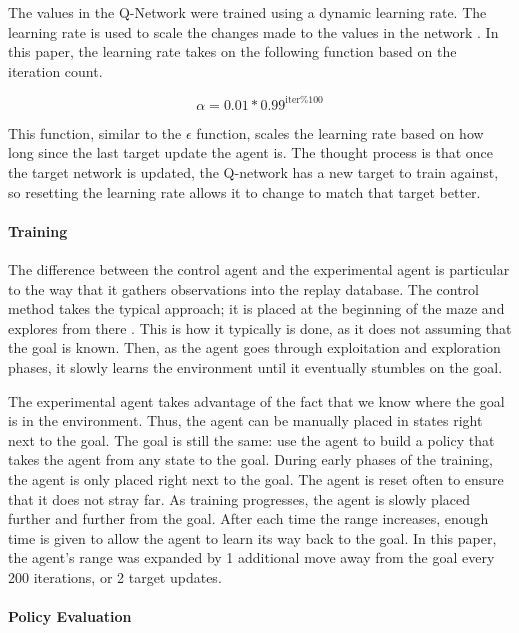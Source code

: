 \documentclass[12pt]{article}
\begin{document}
The values in the Q-Network were trained using a dynamic learning rate.
The learning rate is used to scale the changes made to the values in the network \cite{article_reinforcement_learning_for_robots}.
In this paper, the learning rate takes on the following function based on the iteration count.

$$\alpha = 0.01 * 0.99^{\text{iter} \% 100}$$

This function, similar to the $\epsilon$ function, scales the learning rate based on how long since the last target update the agent is.
The thought process is that once the target network is updated, the Q-network has a new target to train against, so resetting the learning rate allows it to change to match that target better.

\paragraph{Training} 

The difference between the control agent and the experimental agent is particular to the way that it gathers observations into the replay database.
The control method takes the typical approach; it is placed at the beginning of the maze and explores from there \cite{article_reinforcement_learning_survey}.
This is how it typically is done, as it does not assuming that the goal is known.
Then, as the agent goes through exploitation and exploration phases, it slowly learns the environment until it eventually stumbles on the goal.

The experimental agent takes advantage of the fact that we know where the goal is in the environment.
Thus, the agent can be manually placed in states right next to the goal.
The goal is still the same: use the agent to build a policy that takes the agent from any state to the goal.
During early phases of the training, the agent is only placed right next to the goal.
The agent is reset often to ensure that it does not stray far.
As training progresses, the agent is slowly placed further and further from the goal.
After each time the range increases, enough time is given to allow the agent to learn its way back to the goal.
In this paper, the agent's range was expanded by 1 additional move away from the goal every 200 iterations, or 2 target updates.

\paragraph{Policy Evaluation}
\end{document}
